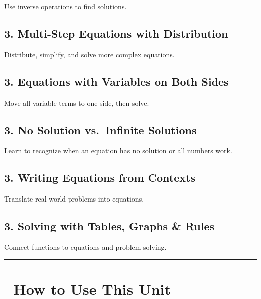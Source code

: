 \documentclass[
  letterpaper,
  DIV=11,
  numbers=noendperiod]{scrreprt}
\begin{document}
Use inverse operations to find solutions.

\subsection*{3. Multi-Step Equations with
Distribution}\label{multi-step-equations-with-distribution}

Distribute, simplify, and solve more complex equations.

\subsection*{3. Equations with Variables on Both
Sides}\label{equations-with-variables-on-both-sides}

Move all variable terms to one side, then solve.

\subsection*{3. No Solution vs.~Infinite
Solutions}\label{no-solution-vs.-infinite-solutions}

Learn to recognize when an equation has no solution or all numbers work.

\subsection*{3. Writing Equations from
Contexts}\label{writing-equations-from-contexts}

Translate real-world problems into equations.

\subsection*{3. Solving with Tables, Graphs \&
Rules}\label{solving-with-tables-graphs-rules}

Connect functions to equations and problem-solving.

\begin{center}\rule{0.5\linewidth}{0.5pt}\end{center}

\section*{🧭 How to Use This Unit}\label{how-to-use-this-unit}
\end{document}
